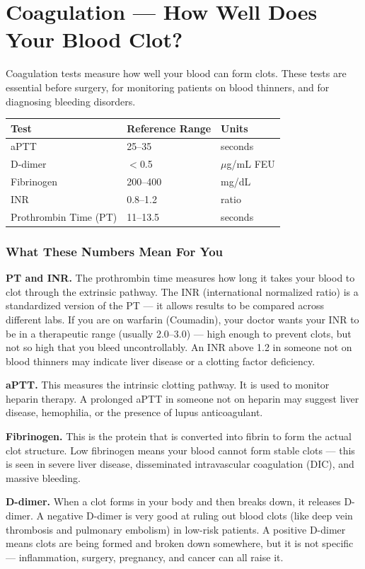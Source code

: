 \clearpage
\section{Coagulation --- How Well Does Your Blood Clot?}

Coagulation tests measure how well your blood can form clots. These tests are essential before surgery, for monitoring patients on blood thinners, and for diagnosing bleeding disorders.

\begin{longtable}{@{}lll@{}}
\toprule
\textbf{Test} & \textbf{Reference Range} & \textbf{Units} \\
\midrule
aPTT & 25--35 & seconds \\
D-dimer & $<$0.5 & $\mu$g/mL FEU \\
Fibrinogen & 200--400 & mg/dL \\
INR & 0.8--1.2 & ratio \\
Prothrombin Time (PT) & 11--13.5 & seconds \\
\bottomrule
\end{longtable}

\subsubsection{What These Numbers Mean For You}

\textbf{PT and INR.} The prothrombin time measures how long it takes your blood to clot through the extrinsic pathway. The INR (international normalized ratio) is a standardized version of the PT --- it allows results to be compared across different labs. If you are on warfarin (Coumadin), your doctor wants your INR to be in a therapeutic range (usually 2.0--3.0) --- high enough to prevent clots, but not so high that you bleed uncontrollably. An INR above 1.2 in someone not on blood thinners may indicate liver disease or a clotting factor deficiency.

\textbf{aPTT.} This measures the intrinsic clotting pathway. It is used to monitor heparin therapy. A prolonged aPTT in someone not on heparin may suggest liver disease, hemophilia, or the presence of lupus anticoagulant.

\textbf{Fibrinogen.} This is the protein that is converted into fibrin to form the actual clot structure. Low fibrinogen means your blood cannot form stable clots --- this is seen in severe liver disease, disseminated intravascular coagulation (DIC), and massive bleeding.

\textbf{D-dimer.} When a clot forms in your body and then breaks down, it releases D-dimer. A negative D-dimer is very good at ruling out blood clots (like deep vein thrombosis and pulmonary embolism) in low-risk patients. A positive D-dimer means clots are being formed and broken down somewhere, but it is not specific --- inflammation, surgery, pregnancy, and cancer can all raise it.

